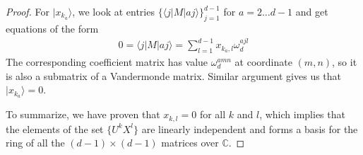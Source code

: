 \documentclass[11pt,letterpaper]{article}
\newcommand{\ket}[1]{|#1\rangle}
\newcommand{\bra}[1]{\langle#1|}
\newcommand{\ketbra}[2]{|#1\rangle\langle#2|}
\newcommand{\C}{\mathbb{C}}
\newcommand{\1}{\mathbb{1}}
\newcommand{\Pg}{\mathcal{P}}
\newcommand{\J}{\mathcal{J}}
\newcommand{\paulix}{\sigma_x}
\newcommand{\pauliz}{\sigma_z}
\newcommand{\G}{G}
\newcommand{\LS}{LS}
\theoremstyle{definition}
\begin{document}
\begin{proof}
For $\ket{x_{k_a}}$, we look at entries $\{\bra{j}M\ket{aj}\}_{j=1}^{d-1}$ for $a = 2 \dots d-1$ and get equations
of the form
\begin{align}
	0 = \bra{j}M\ket{aj} = \sum_{l=1}^{d-1} x_{k_a, l} \omega_d^{ajl} 
\end{align}
The corresponding coefficient matrix has value $\omega_d^{amn}$ at coordinate $(m,n)$,
so it is also a submatrix of a Vandermonde matrix. Similar argument gives us that $\ket{x_{k_a}} = 0$.

To summarize, we have proven that $x_{k,l} = 0$ for all $k$ and $l$, which implies that the elements of the set
$\{ U^k X^l \}$ are linearly independent and forms a basis for the ring of all the $(d-1)\times(d-1)$ matrices over $\C$.
\end{proof}
%
\end{document}
